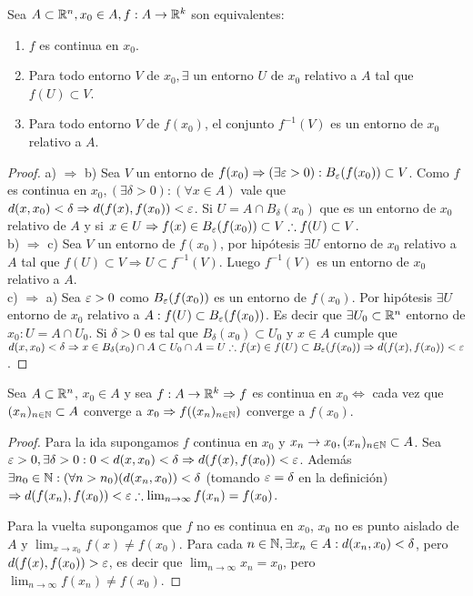 \clearpage

\begin{prop}
  Sea $A \subset \mathbb{R}^n, x_0 \in A, f: A \to \mathbb{R}^k$ son equivalentes:
  \begin{enumerate}
    \item $f$ es continua en $x_0$.
    \item Para todo entorno $V$ de $x_0, \exists$ un entorno $U$ de $x_0$ relativo a $A$ tal que $f(U) \subset V$.
    \item Para todo entorno $V$ de $f(x_0)$, el conjunto $f^{-1}(V)$ es un entorno de $x_0$ relativo a $A$.
  \end{enumerate}

  \begin{proof}
    a) $\Rightarrow$ b) Sea $V$ un entorno de $f(x_0) \Rightarrow (\exists \varepsilon > 0) : B_{\varepsilon}(f(x_0)) \subset V$. Como $f$ es continua en $x_0, (\exists \delta > 0) : (\forall x \in A)$ vale que $d(x, x_0) < \delta \Rightarrow d(f(x), f(x_0)) < \varepsilon$. Si $U = A \cap B_{\delta}(x_0)$ que es un entorno de $x_0$ relativo de $A$ y si $x \in U \Rightarrow f(x) \in B_{\varepsilon}(f(x_0)) \subset V \therefore f(U) \subset V$. \\
    b) $\Rightarrow$ c) Sea $V$ un entorno de $f(x_0)$, por hipótesis $\exists U$ entorno de $x_0$ relativo a $A$ tal que $f(U) \subset V \Rightarrow U \subset f^{-1}(V)$. Luego $f^{-1}(V)$ es un entorno de $x_0$ relativo a $A$. \\
    c) $\Rightarrow$ a) Sea $\varepsilon > 0$ como $B_{\varepsilon}(f(x_0))$ es un entorno de $f(x_0)$. Por hipótesis $\exists U$ entorno de $x_0$ relativo a $A : f(U) \subset B_{\varepsilon}(f(x_0))$. Es decir que $\exists U_0 \subset \mathbb{R}^n$ entorno de $x_0 : U = A \cap U_0$. Si $\delta > 0$ es tal que $B_{\delta}(x_0) \subset U_0$ y $x \in A$ cumple que $d(x, x_0) < \delta \Rightarrow x \in B_{\delta}(x_0) \cap A \subset U_0 \cap A = U \therefore f(x) \in f(U) \subset B_{\varepsilon}(f(x_0))  \Rightarrow d(f(x), f(x_0)) < \varepsilon$.
  \end{proof}
\end{prop}

\begin{prop}
  Sea $A \subset \mathbb{R}^n$, $x_0 \in A$ y sea $f: A \to \mathbb{R}^k \Rightarrow f$ es continua en $x_0 \iff$ cada vez que $(x_n)_{n \in \mathbb{N}} \subset A$ converge a $x_0 \Rightarrow f((x_n)_{n \in \mathbb{N}})$ converge a $f(x_0)$.
  \begin{proof}
    Para la ida supongamos $f$ continua en $x_0$ y $x_n \to x_0, (x_n)_{n \in \mathbb{N}} \subset A$. Sea $\varepsilon > 0, \exists \delta > 0 : 0 < d(x, x_0) < \delta \Rightarrow d(f(x), f(x_0)) < \varepsilon$.
    Además $\exists n_0 \in \mathbb{N} : (\forall n > n_0)(d(x_n, x_0)) < \delta$ (tomando $\varepsilon = \delta$ en la definición) $\Rightarrow d(f(x_n), f(x_0)) < \varepsilon \therefore \lim_{n \to \infty} f(x_n) = f(x_0)$.

    Para la vuelta supongamos que $f$ no es continua en $x_0$, $x_0$ no es punto aislado de $A$ y $\lim_{x \to x_0} f(x) \neq f(x_0)$. Para cada $n \in \mathbb{N}, \exists x_n \in A : d(x_n, x_0) < \delta$, pero $d(f(x), f(x_0)) > \varepsilon$, es decir que $\lim_{n \to \infty} x_n = x_0$, pero $\lim_{n \to \infty} f(x_n) \neq f(x_0)$.
  \end{proof}
\end{prop}

